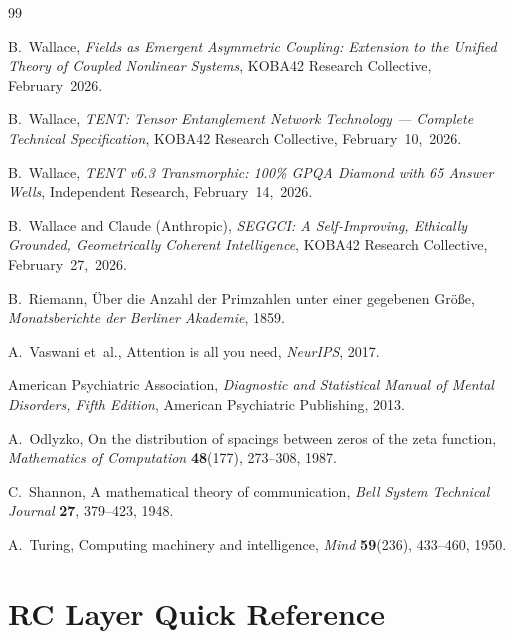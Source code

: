 \documentclass[12pt,a4paper]{article}
\theoremstyle{plain}
\theoremstyle{definition}
\theoremstyle{remark}
\begin{document}
\begin{thebibliography}{99}

B.~Wallace,
\textit{Fields as Emergent Asymmetric Coupling: Extension to the Unified
Theory of Coupled Nonlinear Systems},
KOBA42 Research Collective, February~2026.

B.~Wallace,
\textit{TENT: Tensor Entanglement Network Technology --- Complete Technical
Specification},
KOBA42 Research Collective, February~10,~2026.

B.~Wallace,
\textit{TENT v6.3 Transmorphic: 100\% GPQA Diamond with 65 Answer Wells},
Independent Research, February~14,~2026.

B.~Wallace and Claude (Anthropic),
\textit{SEGGCI: A Self-Improving, Ethically Grounded, Geometrically Coherent
Intelligence},
KOBA42 Research Collective, February~27,~2026.

B.~Riemann,
\"{U}ber die Anzahl der Primzahlen unter einer gegebenen Gr\"{o}\ss{}e,
\textit{Monatsberichte der Berliner Akademie}, 1859.

A.~Vaswani et~al.,
Attention is all you need,
\textit{NeurIPS}, 2017.

American Psychiatric Association,
\textit{Diagnostic and Statistical Manual of Mental Disorders, Fifth Edition},
American Psychiatric Publishing, 2013.

A.~Odlyzko,
On the distribution of spacings between zeros of the zeta function,
\textit{Mathematics of Computation} \textbf{48}(177), 273--308, 1987.

C.~Shannon,
A mathematical theory of communication,
\textit{Bell System Technical Journal} \textbf{27}, 379--423, 1948.

A.~Turing,
Computing machinery and intelligence,
\textit{Mind} \textbf{59}(236), 433--460, 1950.

\end{thebibliography}

\appendix

\section{RC Layer Quick Reference}
\label{app:rcref}
\end{document}
